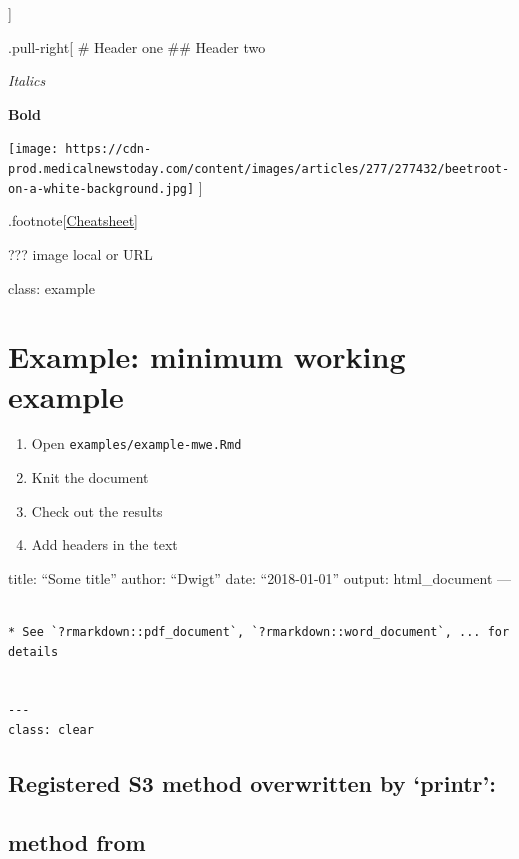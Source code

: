 \documentclass[]{article}
\begin{document}
{]}

.pull-right{[} \# Header one \#\# Header two

\emph{Italics}

\textbf{Bold}

\texttt{[image: https://cdn-prod.medicalnewstoday.com/content/images/articles/277/277432/beetroot-on-a-white-background.jpg]}
{]}

.footnote{[}\href{https://github.com/rstudio/cheatsheets/raw/master/rmarkdown-2.0.pdf}{Cheatsheet}{]}

??? image local or URL

class: example

\hypertarget{example-minimum-working-example}{%
\section{Example: minimum working
example}\label{example-minimum-working-example}}

\begin{enumerate}
\def\labelenumi{\arabic{enumi}.}
\item
  Open \texttt{examples/example-mwe.Rmd}
\item
  Knit the document
\item
  Check out the results
\item
  Add headers in the text
\end{enumerate}

title: ``Some title'' author: ``Dwigt'' date: ``2018-01-01'' output:
html\_document ---

\begin{verbatim}

* See `?rmarkdown::pdf_document`, `?rmarkdown::word_document`, ... for details


---
class: clear

\end{verbatim}

\hypertarget{registered-s3-method-overwritten-by-printr}{%
\subsection{Registered S3 method overwritten by
`printr':}\label{registered-s3-method-overwritten-by-printr}}

\hypertarget{method-from}{%
\subsection{method from}\label{method-from}}
\end{document}
